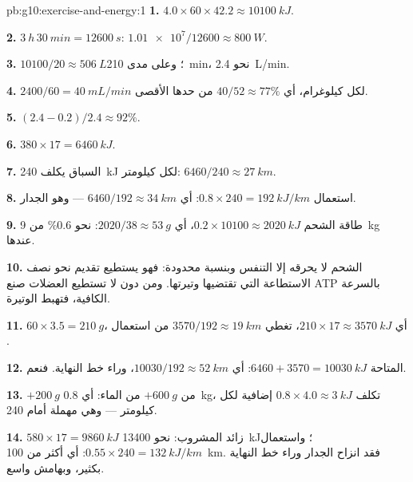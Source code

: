 \begin{solution}{pb:g10:exercise-and-energy:1}
\textbf{1.} $4.0 \times 60 \times 42.2 \approx \qty{10100}{kJ}$.

\textbf{2.} $\qty{3}{h}\,\qty{30}{min} = \qty{12600}{s}$:
$\num{1.01e7}/12600 \approx \qty{800}{W}$.

\textbf{3.} $10100/20 \approx \qty{506}{L}$؛ وعلى مدى \qty{210}{min}،
نحو \qty{2.4}{L/min}.

\textbf{4.} $2400/60 = \qty{40}{mL/min}$ لكل كيلوغرام، أي $40/52
\approx 77\%$ من حدها الأقصى.

\textbf{5.} $(2.4 - 0.2)/2.4 \approx 92\%$.

\textbf{6.} $380 \times 17 = \qty{6460}{kJ}$.

\textbf{7.} السباق يكلف \qty{240}{kJ} لكل كيلومتر: $6460/240
\approx \qty{27}{km}$.

\textbf{8.} استعمال  $0.8 \times 240 = \qty{192}{kJ/km}$:
أي $6460/192 \approx \qty{34}{km}$ --- وهو الجدار.

\textbf{9.} طاقة الشحم $0.2 \times 10100 \approx \qty{2020}{kJ}$، أي
$2020/38 \approx \qty{53}{g}$: نحو 0.6\% من \qty{9}{kg} عندها.

\textbf{10.} الشحم لا يحرقه إلا التنفس وبنسبة محدودة: فهو يستطيع تقديم
نحو نصف الاستطاعة التي تقتضيها وتيرتها. ومن دون  لا تستطيع
العضلات صنع ATP بالسرعة الكافية، فتهبط الوتيرة.

\textbf{11.} $60 \times 3.5 = \qty{210}{g}$، أي $210 \times 17 \approx
\qty{3570}{kJ}$، تغطي $3570/192 \approx \qty{19}{km}$ من استعمال
.

\textbf{12.}  المتاحة $6460 + 3570 = \qty{10030}{kJ}$:
أي $10030/192 \approx \qty{52}{km}$، وراء خط النهاية. فنعم.

\textbf{13.} $+\qty{200}{g}$ من  $+ \qty{600}{g}$ من الماء:
أي \qty{0.8}{kg}، تكلف $0.8 \times 4.0 \approx \qty{3}{kJ}$ إضافية لكل
كيلومتر --- وهي مهملة أمام 240.

\textbf{14.}  $580 \times 17 = \qty{9860}{kJ}$ زائد المشروب:
نحو \qty{13400}{kJ}؛ واستعمال  $0.55 \times 240 =
\qty{132}{kJ/km}$: أي أكثر من \qty{100}{km}. فقد انزاح الجدار وراء خط
النهاية بكثير، وبهامش واسع.


\end{solution}
